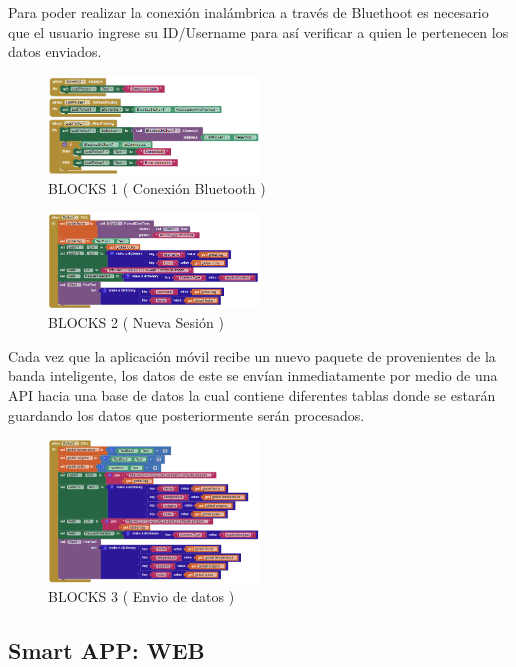 \documentclass[osajnl,twocolumn,showpacs,superscriptaddress,10pt]{revtex4-1}
\begin{document}
    Para poder realizar la conexión inalámbrica a través de  Bluethoot es necesario que el usuario ingrese su ID/Username para así verificar a quien le pertenecen los datos enviados.
    
\begin{figure} [H] \centering 
\caption{BLOCKS 1 ( Conexión Bluetooth )}
\includegraphics[width=0.5\textwidth]{ConexionBT.png} 
\end{figure}

\begin{figure} [H] \centering 
\caption{BLOCKS 2 ( Nueva Sesión )}
\includegraphics[width=0.5\textwidth]{NuevaSesion.PNG} 
\end{figure}

    Cada vez que la aplicación móvil recibe un nuevo paquete de provenientes de la banda inteligente, los datos de este se envían inmediatamente por medio de una API hacia una base de datos la cual contiene diferentes tablas donde se estarán guardando los datos que posteriormente serán procesados.
    
\begin{figure} [H] \centering 
\caption{BLOCKS 3 ( Envio de datos )}
\includegraphics[width=0.5\textwidth]{EviarDatos.PNG} 
\end{figure}
\subsection{Smart APP: WEB}
\end{document}
